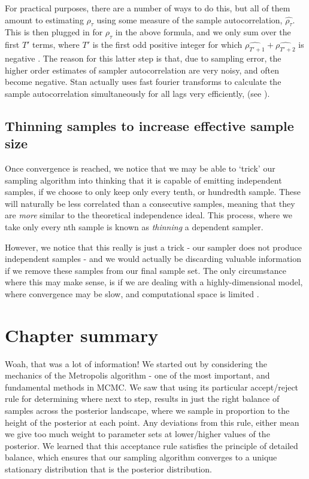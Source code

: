 \documentclass[11pt,fullpage]{book}
\begin{document}
For practical purposes, there are a number of ways to do this, but all of them amount to estimating $\rho_\tau$ using some measure of the sample autocorrelation, $\hat{\rho_\tau}$. This is then plugged in for $\rho_\tau$ in the above formula, and we only sum over the first $T'$ terms, where $T'$ is the first odd positive integer for which $\hat{\rho_{T'+1}} + \hat{\rho_{T'+2}}$ is negative \cite{stan-manual:2015}. The reason for this latter step is that, due to sampling error, the higher order estimates of sampler autocorrelation are very noisy, and often become negative. Stan actually uses fast fourier transforms to calculate the sample autocorrelation simultaneously for all lags very efficiently, (see \cite{bergland1969guided}). 

\subsection{Thinning samples to increase effective sample size}
Once convergence is reached, we notice that we may be able to `trick' our sampling algorithm into thinking that it is capable of emitting independent samples, if we choose to only keep only every tenth, or hundredth sample. These will naturally be less correlated than a consecutive samples, meaning that they are \textit{more} similar to the theoretical independence ideal. This process, where we take only every nth sample is known as \textit{thinning} a dependent sampler. 

However, we notice that this really is just a trick - our sampler does not produce independent samples - and we would actually be discarding valuable information if we remove these samples from our final sample set. The only circumstance where this may make sense, is if we are dealing with a highly-dimensional model, where convergence may be slow, and computational space is limited \cite{gelman2013bayesian}. 

\section{Chapter summary}
Woah, that was a lot of information! We started out by considering the mechanics of the Metropolis algorithm - one of the most important, and fundamental methods in MCMC. We saw that using its particular accept/reject rule for determining where next to step, results in just the right balance of samples across the posterior landscape, where we sample in proportion to the height of the posterior at each point. Any deviations from this rule, either mean we give too much weight to parameter sets at lower/higher values of the posterior. We learned that this acceptance rule satisfies the principle of detailed balance, which ensures that our sampling algorithm converges to a unique stationary distribution that is the posterior distribution. 
\end{document}

